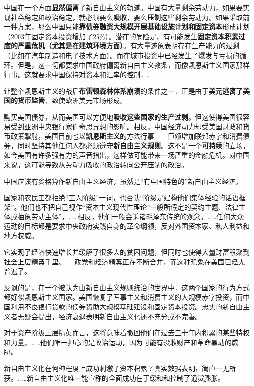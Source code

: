 中国在一个方面\textbf{显然偏离}了新自由主义的轨道。中国有大量剩余劳动力，如果要实现社会稳定和政治稳定，就必须要么\textbf{吸收}，要么\textbf{压制}这些剩余劳动力。如果采取前一种方案，那么中国只能\textbf{靠债券融资大规模开展基础设施计划和固定资本}形成计划（2003年固定资本投资增加了25\%）。潜在的危险是，有可能发生\textbf{固定资本积累过度的严重危机（尤其是在建筑环境方面）}。有大量迹象表明存在生产能力的过剩（比如在汽车制造和电子技术方面）。而在城市投资中已经发生了爆发与亏损的循环。但是，这一切都要求中国政府偏离新自由主义教条，而像凯恩斯主义国家那样行事。这就要求中国保持对资本和汇率的控制……

让整个凯恩斯主义的战后\textbf{布雷顿森林体系崩溃}的条件之一，正是由于\textbf{美元逃离了美国的货币监管}，致使欧洲美元市场形成。

购买美国债券，从而美国可以方便地\textbf{吸收这些国家的生产过剩}。但这使得美国很容易受到亚洲中央银行家们奇思异想的影响。相反，中国经济动力却受美国财政和货币政策掣肘。美国目前也以\textbf{凯恩斯主义}的方法行事——巨额增加联邦赤字和消费债券，同时坚持其他任何人都必须遵守\textbf{新自由主义规则}。这不是一个\textbf{可持续}的立场，如今美国有许多强有力的声音指出，这样做可能带来一场严重的金融危机。对中国来说，这可能导致从劳动力吸收的政治转向公开压制的政治。

中国应该有资格算作新自由主义经济，虽然是“有中国特色的”新自由主义经济。

国家和农民工都拒绝“工人阶级”一词，也否认“阶级是建构他们集体经验的话语框架”。他们也不把自己视作“资本主义现代性理论”一般所假定的契约主题、法律主体或抽象劳动主体”，……相反，他们一般会诉诸毛泽东传统的观念。……任何大众运动的目标都是要求中央政府实践自身的革命纲领，反对外国资本家、私人利益和地方权威。

它实现了经济快速增长并缓解了很多人的贫困问题，但同时也使得大量财富积聚到社会上层精英手里。……政党和经济精英正在不断合并，而这种现象在美国已经太普遍了。

反讽的是，在一个被认为由新自由主义规则统治的世界中，这两个国家的行为方式都好似凯恩斯主义国家。美国恢复了军事主义和消费主义的大规模赤字投资，而中国利用不良银行贷款的债券资助大规模基础建设和固定资本投资。忠实的新自由主义者无疑会提出，经济衰退表明新自由主义化还不充分或不完善。

对于资产阶级上层精英而言，这将意味着撤回他们在过去三十年内积累的某些特权和力量。……他们唯一担心的是政治运动，因为可能有没收财产和革命暴动的威胁。

新自由主义化在何种程度上成功刺激了资本积累？真实数据表明，简直一无所获。……新自由主义化唯一能宣称的全面成功在于缓和和控制了通货膨胀。

